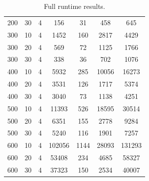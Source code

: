 \documentclass{article}
\begin{document}
\begin{table}[H]
\begin{center}
\begin{tabular}{| c | c | c | c | c | c | c |}
                    200 & 30 & 4 & 156 & 31 & 458 & 645 \\
                    300 & 10 & 4 & 1452 & 160 & 2817 & 4429 \\
                    300 & 20 & 4 & 569 & 72 & 1125 & 1766 \\
                    300 & 30 & 4 & 338 & 36 & 702 & 1076 \\
                    400 & 10 & 4 & 5932 & 285 & 10056 & 16273 \\
                    400 & 20 & 4 & 3531 & 126 & 1717 & 5374 \\
                    400 & 30 & 4 & 3040 & 73 & 1138 & 4251 \\
                    500 & 10 & 4 & 11393 & 526 & 18595 & 30514 \\
                    500 & 20 & 4 & 6351 & 155 & 2778 & 9284 \\
                    500 & 30 & 4 & 5240 & 116 & 1901 & 7257 \\
                    600 & 10 & 4 & 102056 & 1144 & 28093 & 131293 \\
                    600 & 20 & 4 & 53408 & 234 & 4685 & 58327 \\
                    600 & 30 & 4 & 37323 & 150 & 2534 & 40007 \\
                \hline
            \end{tabular}
            \caption{Full runtime results.}
            \label{tab:results-full-runtime}
        \end{center}
    \end{table}
\end{document}
